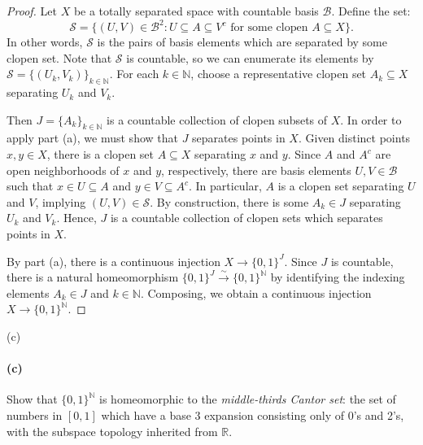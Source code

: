 \documentclass[12pt]{article}
\newlength{\myparskip}
\newenvironment{fullbox}{\begin{lrbox}{\savefullbox}\begin{minipage}{\dimexpr\textwidth-2\fboxsep\relax}\setlength{\parskip}{\myparskip}}{\end{minipage}\end{lrbox}\framebox[\textwidth]{\usebox{\savefullbox}}}
\newenvironment{pbox}[1][]{\begin{fullbox}\ifx#1\empty\else\paragraph{#1}\fi}{\end{fullbox}}
\theoremstyle{definition}
\newcommand{\N}{\mathbb{N}}
\newcommand{\<}{\langle}
\renewcommand{\>}{\rangle}
\begin{document}
\begin{proof}
    Let $X$ be a totally separated space with countable basis $\mathcal{B}$.
    Define the set:
    \[
        \mathcal{S} = \{(U, V) \in \mathcal{B}^2 : U \subseteq A \subseteq V^c \text{ for some clopen } A \subseteq X\}.
    \]
    In other words, $\mathcal{S}$ is the pairs of basis elements which are separated by some clopen set.
    Note that $\mathcal{S}$ is countable, so we can enumerate its elements by $\mathcal{S} = \{(U_k, V_k)\}_{k \in \N}$.
    For each $k \in \N$, choose a representative clopen set $A_k \subseteq X$ separating $U_k$ and $V_k$.

    Then $J = \{A_k\}_{k \in \N}$ is a countable collection of clopen subsets of $X$.
    In order to apply part (a), we must show that $J$ separates points in $X$.
    Given distinct points $x, y \in X$, there is a clopen set $A \subseteq X$ separating $x$ and $y$.
    Since $A$ and $A^c$ are open neighborhoods of $x$ and $y$, respectively, there are basis elements $U, V \in \mathcal{B}$ such that $x \in U \subseteq A$ and $y \in V \subseteq A^c$.
    In particular, $A$ is a clopen set separating $U$ and $V$, implying $(U, V) \in \mathcal{S}$.
    By construction, there is some $A_k \in J$ separating $U_k$ and $V_k$.
    Hence, $J$ is a countable collection of clopen sets which separates points in $X$.

    By part (a), there is a continuous injection $X \to \{0, 1\}^J$.
    Since $J$ is countable, there is a natural homeomorphism $\{0, 1\}^J \xrightarrow{\sim} \{0, 1\}^\N$ by identifying the indexing elements $A_k \in J$ and $k \in \N$.
    Composing, we obtain a continuous injection $X \to \{0, 1\}^\N$.
\end{proof}

\newpage
\begin{pbox}[(c)]
    Show that $\{0,1\}^{\mathbb N}$ is homeomorphic to the
    \emph{middle-thirds Cantor set}: the set of numbers in $[0,1]$ which have a
    base 3 expansion consisting only of 0's and 2's, with the subspace topology
    inherited from $\mathbb R$.
\end{pbox}
\end{document}
